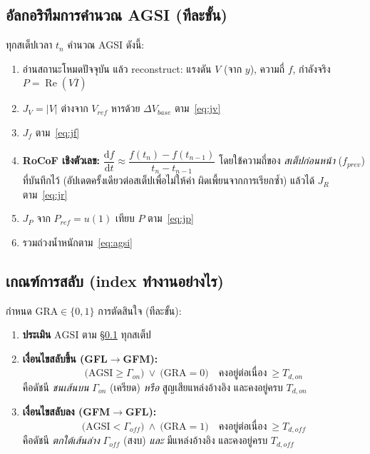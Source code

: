 \documentclass[12pt,a4paper]{article}
\newcommand{\re}{\operatorname{Re}}
\begin{document}
\subsection{อัลกอริทึมการคำนวณ AGSI (ทีละขั้น)}
\label{sec:algo}
ทุกสเต็ปเวลา $t_n$ คำนวณ AGSI ดังนี้:
\begin{enumerate}
\item อ่านสถานะโหมดปัจจุบัน แล้ว reconstruct: แรงดัน $V$ (จาก $y$), ความถี่ $f$, กำลังจริง $P=\re(V\overline{I})$
\item $J_V=\lvert V\rvert$ ต่างจาก $V_{ref}$ หารด้วย $\Delta V_{base}$ ตาม~\eqref{eq:jv}
\item $J_f$ ตาม~\eqref{eq:jf}
\item \textbf{RoCoF เชิงตัวเลข:} $\dfrac{\mathrm{d}f}{\mathrm{d}t}\approx\dfrac{f(t_n)-f(t_{n-1})}{t_n-t_{n-1}}$
โดยใช้ความถี่ของ \emph{สเต็ปก่อนหน้า} ($f_{prev}$) ที่บันทึกไว้ (อัปเดตครั้งเดียวต่อสเต็ปเพื่อไม่ให้ค่า
ผิดเพี้ยนจากการเรียกซ้ำ) แล้วได้ $J_R$ ตาม~\eqref{eq:jr}
\item $J_P$ จาก $P_{ref}=u(1)$ เทียบ $P$ ตาม~\eqref{eq:jp}
\item รวมถ่วงน้ำหนักตาม~\eqref{eq:agsi}
\end{enumerate}

\subsection{เกณฑ์การสลับ (index ทำงานอย่างไร)}
กำหนด $\mathrm{GRA}\in\{0,1\}$ การตัดสินใจ (ทีละขั้น):
\begin{enumerate}
\item \textbf{ประเมิน} $\mathrm{AGSI}$ ตาม \S\ref{sec:algo} ทุกสเต็ป
\item \textbf{เงื่อนไขสลับขึ้น (GFL$\to$GFM):}
\begin{equation}
\big(\mathrm{AGSI}\ge\Gamma_{on}\big)\ \lor\ \big(\mathrm{GRA}=0\big)
\quad\text{คงอยู่ต่อเนื่อง}\ \ge T_{d,on}
\label{eq:up}
\end{equation}
คือดัชนี \emph{ชนเส้นบน} $\Gamma_{on}$ (เครียด) \emph{หรือ} สูญเสียแหล่งอ้างอิง และคงอยู่ครบ $T_{d,on}$
\item \textbf{เงื่อนไขสลับลง (GFM$\to$GFL):}
\begin{equation}
\big(\mathrm{AGSI}<\Gamma_{off}\big)\ \land\ \big(\mathrm{GRA}=1\big)
\quad\text{คงอยู่ต่อเนื่อง}\ \ge T_{d,off}
\label{eq:down}
\end{equation}
คือดัชนี \emph{ตกใต้เส้นล่าง} $\Gamma_{off}$ (สงบ) \emph{และ} มีแหล่งอ้างอิง และคงอยู่ครบ $T_{d,off}$
\end{enumerate}
\end{document}
